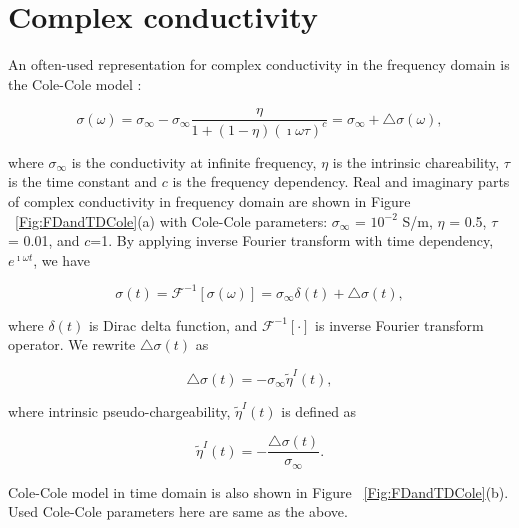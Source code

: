 \documentclass[extra,mreferee]{gji}
\newcommand{\siginf}{\sigma_\infty}
\newcommand{\dsig}{\triangle\sigma}
\newcommand{\peta}{\tilde{\eta}}
\begin{document}
\section{Complex conductivity}
An often-used representation for complex conductivity in the frequency domain is the Cole-Cole model \cite{COLE}:
\begin{linenomath*}
\begin{equation}
  \sigma(\omega) = \sigma_{\infty} - \sigma_{\infty}\frac{\eta}{1+(1-\eta)(\imath\omega\tau)^c} = \sigma_{\infty} + \triangle\sigma(\omega),
  \label{eq: sigma_freq}
\end{equation}
\end{linenomath*}
where $\sigma_{\infty}$ is the conductivity at infinite frequency, $\eta$ is the intrinsic chareability, $\tau$ is the time constant and $c$ is the frequency dependency. Real and imaginary parts of complex conductivity in frequency domain are shown in Figure ~\ref{Fig:FDandTDCole}(a) with Cole-Cole parameters: $\siginf$ = $10^{-2}$ S/m, $\eta $ = 0.5, $\tau$ = 0.01, and $c$=1. By applying inverse Fourier transform with time dependency, $e^{\imath\omega t}$, we have
\begin{linenomath*}
\begin{equation}
  \sigma(t) = \mathscr{F}^{-1}[\sigma(\omega)] = \sigma_{\infty}\delta(t) + \triangle\sigma(t),
  \label{eq: sigma_time}
\end{equation}
\end{linenomath*}
where $\delta(t)$ is Dirac delta function, and $\mathscr{F}^{-1}[\cdot]$ is inverse Fourier transform operator. 
We rewrite $\dsig(t)$ as 
\begin{linenomath*}
\begin{equation}
  \dsig(t) = - \siginf\peta^{I}(t),
  \label{eq: sigma_time_c1}
\end{equation}
\end{linenomath*}
where intrinsic pseudo-chargeability, $\peta^{I}(t)$ is defined as
\begin{linenomath*}
\begin{equation}
    \peta^{I}(t) = -\frac{\dsig(t)}{\siginf}. %
    \label{eq: intrinsic_peta}
\end{equation}
\end{linenomath*}
Cole-Cole model in time domain is also shown in Figure ~\ref{Fig:FDandTDCole}(b). Used Cole-Cole parameters here are same as the above.
\end{document}
